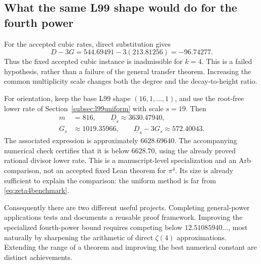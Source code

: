 \subsection{What the same L99 shape would do for the fourth power}

For the accepted cubic rates, direct substitution gives
\[
D-3G=544.69491-3(213.81256)=-96.74277.
\]
Thus the fixed accepted cubic instance is inadmissible for \(k=4\).
This is a failed hypothesis, rather than a failure of the general
transfer theorem. Increasing the common multiplicity scale changes
both the degree and the decay-to-height ratio.

For orientation, keep the base L99 shape
\((16,1,\ldots,1)\), and use the root-free lower rate of
Section~\ref{subsec:l99uniform} with scale \(s=19\). Then
\[
\begin{split}
m&=816,\qquad \underline D_s\approx3630.47940,\\
G_s&\approx1019.35966,\qquad
\underline D_s-3G_s\approx572.40043.
\end{split}
\]
The associated expression is approximately \(6628.69640\).
The accompanying numerical check certifies that it is below
\(6628.70\), using the already proved rational divisor lower rate.
This is a manuscript-level specialization and an Arb comparison,
not an accepted fixed Lean theorem for \(\pi^4\). Its size is
already sufficient to explain the comparison: the uniform method
is far from \eqref{eq:zeta4benchmark}.

Consequently there are two different useful projects. Completing
general-power applications tests and documents a reusable proof
framework. Improving the specialized fourth-power bound requires
competing below \(12.51085940\ldots\), most naturally by sharpening
the arithmetic of direct \(\zeta(4)\) approximations. Extending the
range of a theorem and improving the best numerical constant are
distinct achievements.
